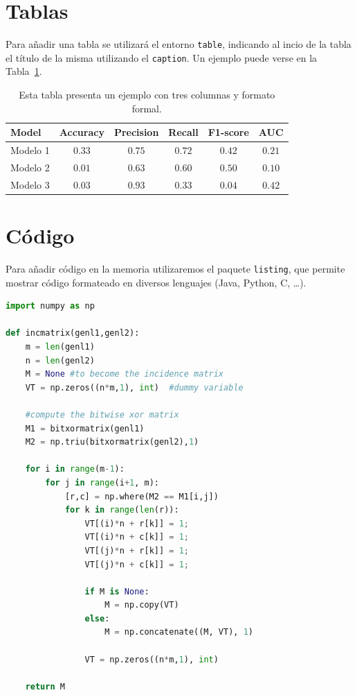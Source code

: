 \section{Tablas}
Para añadir una tabla se utilizará el entorno \verb|table|, indicando al incio de la tabla el título de la misma utilizando el \verb|caption|. Un ejemplo puede verse en la Tabla~\ref{tab:Ejemplo-de-tabla}.

\begin{table}[ht]

\centering
\caption[Ejemplo de tabla]{Esta tabla presenta un ejemplo con tres columnas y formato formal.\label{tab:Ejemplo-de-tabla}}
\begin{tabular}[t]{lccccc}
\hline
Model & Accuracy & Precision & Recall & F1-score & AUC\\ %
\hline
Modelo 1 & $0.33$ & $0.75$ & $0.72$ & $0.42$ & $0.21$ \\
Modelo 2 & $0.01$ & $0.63$ & $0.60$ & $0.50$ & $0.10$ \\
Modelo 3 & $0.03$ & $0.93$ & $0.33$ & $0.04$ & $0.42$ \\
\hline
\end{tabular}
\end{table}



\section{Código}
Para añadir código en la memoria utilizaremos el paquete \verb|listing|, que permite mostrar código formateado en diversos lenguajes (Java, Python, C, \ldots). 

\begin{lstlisting}[language=Python, caption={Título del fragmento de código}, captionpos=b]
import numpy as np
    
def incmatrix(genl1,genl2):
    m = len(genl1)
    n = len(genl2)
    M = None #to become the incidence matrix
    VT = np.zeros((n*m,1), int)  #dummy variable
    
    #compute the bitwise xor matrix
    M1 = bitxormatrix(genl1)
    M2 = np.triu(bitxormatrix(genl2),1) 

    for i in range(m-1):
        for j in range(i+1, m):
            [r,c] = np.where(M2 == M1[i,j])
            for k in range(len(r)):
                VT[(i)*n + r[k]] = 1;
                VT[(i)*n + c[k]] = 1;
                VT[(j)*n + r[k]] = 1;
                VT[(j)*n + c[k]] = 1;
                
                if M is None:
                    M = np.copy(VT)
                else:
                    M = np.concatenate((M, VT), 1)
                
                VT = np.zeros((n*m,1), int)
    
    return M
\end{lstlisting}

